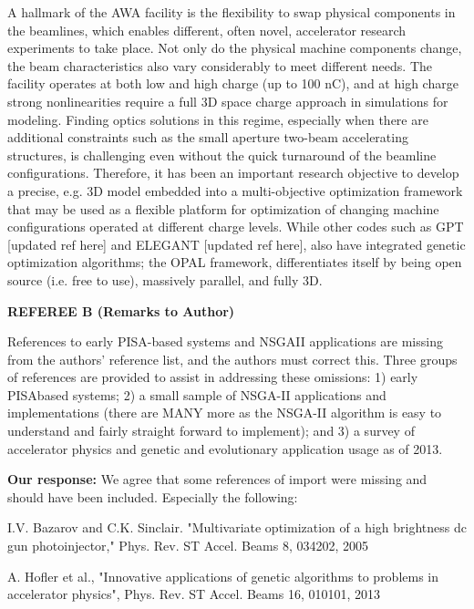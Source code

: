 \documentclass{article}
\begin{document}
{A hallmark of the AWA facility is the flexibility to swap physical
components in the beamlines, which enables different, often novel,
accelerator research experiments to take place.  Not only do the
physical machine components change, the beam characteristics also vary
considerably to meet different needs.  The facility operates at both low
and high charge (up to 100 nC), and at high charge strong nonlinearities
require a full 3D space charge approach in simulations for modeling.  
Finding optics solutions in this regime, especially when
there are additional constraints such as the small aperture two-beam
accelerating structures, is challenging even without the quick
turnaround of the beamline configurations.  Therefore, it has been an
important research objective to develop a precise, e.g. 3D model
embedded into a multi-objective optimization framework that may be used
as a flexible platform for optimization of changing machine
configurations operated at different charge levels. While other codes
such as GPT [updated ref here] and ELEGANT [updated ref here], also have
integrated genetic optimization algorithms; the OPAL framework,
differentiates itself by being open source (i.e. free to use), massively
parallel, and fully 3D.




}



{\bf REFEREE B (Remarks to Author)}

References to early PISA-based systems and NSGAII applications
are missing from the authors’ reference list, and the authors must
correct this. Three groups of references are provided to assist in
addressing these omissions: 1) early PISAbased systems; 2) a small
sample of NSGA-II applications and implementations (there are MANY
more as the NSGA-II algorithm is easy to understand and fairly
straight forward to implement); and 3) a survey of accelerator physics
and genetic and evolutionary application usage as of 2013.

{\bf Our response:} {\color{blue} We agree that some references of import were missing and should have been included.
	Especially the following: }
	
	I.V. Bazarov and C.K. Sinclair. "Multivariate optimization of a high
	brightness dc gun photoinjector," Phys. Rev. ST Accel. Beams 8,
	034202, 2005
	
	A. Hofler et al., "Innovative applications of genetic algorithms to
	problems in accelerator physics", Phys. Rev. ST Accel. Beams 16,
	010101, 2013
	
\end{document}
